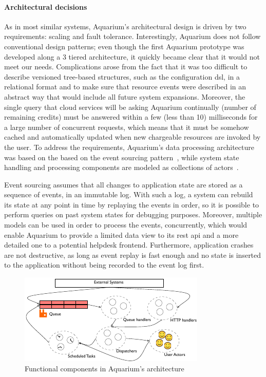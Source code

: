 \paragraph{Architectural decisions} As in most similar systems, Aquarium's
architectural design is driven by two requirements: scaling and fault
tolerance. Interestingly, Aquarium does not follow conventional design
patterns; even though the first Aquarium prototype was developed along a 3
tiered architecture, it quickly became clear that it would not meet our needs.
Complications arose from the fact that it was too difficult to describe
versioned tree-based structures, such as the configuration {\sc dsl},
in a relational format and to
make sure that resource events were described in an abstract way that would
include all future system expansions. Moreover, the single query that cloud
services will be asking Aquarium continually (number of remaining credits) must
be answered within a few (less than 10) milliseconds for a large number of
concurrent requests, which means that it must be somehow cached and
automatically updated when new chargeable resources are invoked by the user.
To address the requirements, Aquarium's data processing architecture was
based on the based on the event sourcing
pattern~\cite{Fowle05}, while system state handling and processing components
are modeled as collections of actors~\cite{Hewit73}.

Event sourcing assumes that all changes to application
state are stored as a sequence of events, in an immutable log. With such a log,
a system can rebuild its state at any point in time by replaying the
events in order, so it is possible to perform queries on past system states for
debugging purposes. Moreover, multiple models can be used in order to process
the events, concurrently, which would enable Aquarium to provide a limited data
view to its {\sc rest api} and a more detailed one to a potential helpdesk
frontend. Furthermore, application crashes are not destructive, as long as
event replay is fast enough and no state is inserted to the application without
being recorded to the event log first.

\begin{figure}
    \begin{center}
    \includegraphics[scale=1.2]{arch.pdf}
    \end{center}
\caption{Functional components in Aquarium's architecture} 
\label{fig:arch}
\end{figure}


